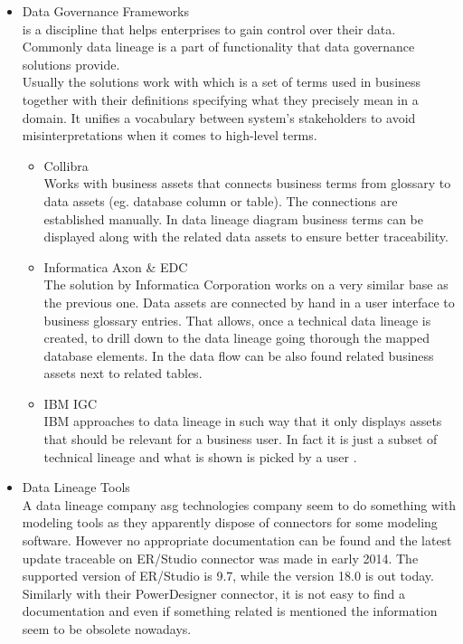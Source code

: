 \begin{itemize}
	\item Data Governance Frameworks \\ 
	 is a discipline that helps enterprises to gain control over their data. Commonly data lineage is a part of functionality that data governance solutions provide. \\
	Usually the solutions work with  which is a set of terms used in business together with their definitions specifying what they precisely mean in a domain. It unifies a vocabulary between system's stakeholders to avoid misinterpretations when it comes to high-level terms. 
	\begin{itemize}
		\item Collibra \\ 
		Works with business assets that connects business terms from glossary to data assets (eg. database column or table). The connections are established manually\cite{CollibraBusinessAssets}. In data lineage diagram business terms can be displayed along with the related data assets to ensure better traceability\cite{CollibraVisualization}.
		\item Informatica Axon \& EDC \\ 
		The solution by Informatica Corporation works on a very similar base as the previous one.
		Data assets are connected by hand in a user interface to business glossary entries\cite{InformaticaBusinessAssets}. That allows, once a technical data lineage is created, to drill down to the data lineage going thorough the mapped database elements. In the data flow can be also found related business assets next to related tables.
		\item IBM IGC \\ 
		IBM approaches to data lineage in such way that it only displays assets that should be relevant for a business user. In fact it is just a subset of technical lineage and what is shown is picked by a user \cite{IbmIgcBusinessLineage}.
	\end{itemize}
	\item Data Lineage Tools \\ 
		A data lineage company asg technologies company seem to do something with modeling tools as they apparently dispose of connectors for some modeling software. However no appropriate documentation can be found and the latest update traceable on ER/Studio connector was made in early 2014. \cite{AsgErStudio}
		The supported version of ER/Studio is 9.7, while the version 18.0 is out today.
		Similarly with their PowerDesigner connector, it is not easy to find a documentation and even if something related is mentioned the information seem to be obsolete nowadays.
	

\end{itemize}
